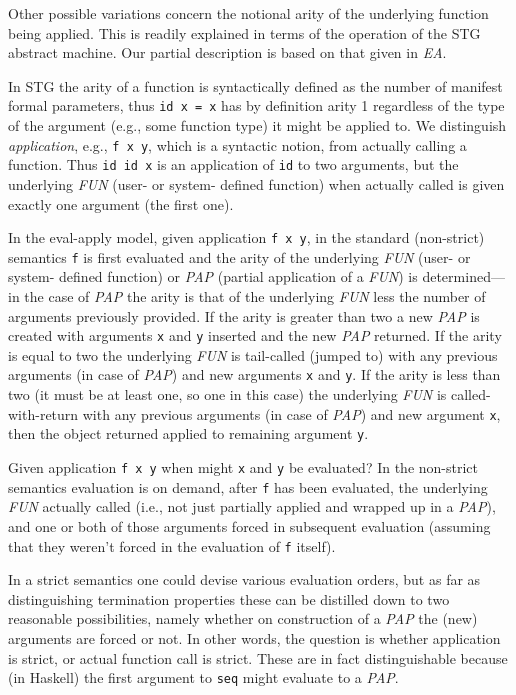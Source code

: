 \documentclass{llncs}
\begin{document}
Other possible variations concern the notional arity of the underlying
function being applied.  This is readily explained in terms of the operation
of the STG abstract machine.  Our partial description is based on that given
in \emph{EA}.

In STG the arity of a function is syntactically defined as the number of
manifest formal parameters, thus \texttt{id x = x} has by definition arity 1
regardless of the type of the argument (e.g., some function type) it might be
applied to.  We distinguish \emph{application}, e.g., \texttt{f x y}, which is
a syntactic notion, from actually calling a function. Thus \texttt{id id x} is
an application of \texttt{id} to two arguments, but the underlying \emph{FUN}
(user- or system- defined function) when actually called is given exactly one
argument (the first one).

In the eval-apply model, given application \texttt{f x y}, in the standard
(non-strict) semantics \texttt{f} is first evaluated and the arity of the
underlying \emph{FUN} (user- or system- defined function) or \emph{PAP}
(partial application of a \emph{FUN}) is determined---in the case of
\emph{PAP} the arity is that of the underlying \emph{FUN} less the number of
arguments previously provided.  If the arity is greater than two a new
\emph{PAP} is created with arguments \texttt{x} and \texttt{y} inserted and
the new \emph{PAP} returned.  If the arity is equal to two the underlying
\emph{FUN} is tail-called (jumped to) with any previous arguments (in case of
\emph{PAP}) and new arguments \texttt{x} and \texttt{y}.  If the arity is less
than two (it must be at least one, so one in this case) the underlying
\emph{FUN} is called-with-return with any previous arguments (in case of
\emph{PAP}) and new argument \texttt{x}, then the object returned applied to
remaining argument \texttt{y}.

Given application \texttt{f x y} when might \texttt{x} and \texttt{y} be
evaluated?  In the non-strict semantics evaluation is on demand, after
\texttt{f} has been evaluated, the underlying \emph{FUN} actually called
(i.e., not just partially applied and wrapped up in a \emph{PAP}), and one or
both of those arguments forced in subsequent evaluation (assuming that they
weren't forced in the evaluation of \texttt{f} itself).

In a strict semantics one could devise various evaluation orders, but as far
as distinguishing termination properties these can be distilled down to two
reasonable possibilities, namely whether on construction of a \emph{PAP} the
(new) arguments are forced or not.  In other words, the question is whether
application is strict, or actual function call is strict.  These are in fact
distinguishable because (in Haskell) the first argument to \texttt{seq} might
evaluate to a \emph{PAP}.
\end{document}
